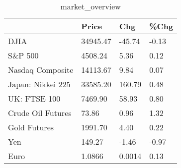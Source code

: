 \documentclass{article}%
\begin{document}
%


\begin{table}[htbp]%
\caption{market\_overview}%
\centering%
\begin{adjustbox}{width=1\textwidth}%
\begin{tabular}{llll}
\toprule
                  &    Price &    Chg &  \%Chg \\
\midrule
             DJIA & 34945.47 & -45.74 & -0.13 \\
          S\&P 500 &  4508.24 &   5.36 &  0.12 \\
 Nasdaq Composite & 14113.67 &   9.84 &  0.07 \\
Japan: Nikkei 225 & 33585.20 & 160.79 &  0.48 \\
     UK: FTSE 100 &  7469.90 &  58.93 &  0.80 \\
Crude Oil Futures &    73.86 &   0.96 &  1.32 \\
     Gold Futures &  1991.70 &   4.40 &  0.22 \\
              Yen &   149.27 &  -1.46 & -0.97 \\
             Euro &   1.0866 & 0.0014 &  0.13 \\
\bottomrule
\end{tabular}
%
\end{adjustbox}%
\end{table}

%
\end{document}

